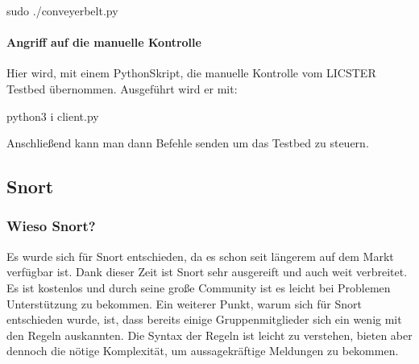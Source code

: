 \documentclass[letterpaper,10pt,ngerman]{sphinxmanual}
\begin{document}
\begin{sphinxVerbatim}[commandchars=\\\{\}]
\PYGZdl{} sudo ./conveyer\PYGZus{}belt.py
\end{sphinxVerbatim}


\paragraph{Angriff auf die manuelle Kontrolle}
\label{\detokenize{ids:angriff-auf-die-manuelle-kontrolle}}
Hier wird, mit einem Python\sphinxhyphen{}Skript, die manuelle Kontrolle vom LICSTER Testbed übernommen.
Ausgeführt wird er mit:

\begin{sphinxVerbatim}[commandchars=\\\{\}]
\PYGZdl{} python3 \PYGZhy{}i client.py
\PYGZgt{}\PYGZgt{}\PYGZgt{}
\end{sphinxVerbatim}

Anschließend kann man dann Befehle senden um das Testbed zu steuern.


\subsection{Snort}
\label{\detokenize{ids:snort}}

\subsubsection{Wieso Snort?}
\label{\detokenize{ids:wieso-snort}}
Es wurde sich für Snort entschieden, da es schon seit längerem auf dem Markt verfügbar ist. Dank dieser Zeit ist Snort sehr ausgereift und auch weit verbreitet. Es ist kostenlos und durch seine große Community ist es leicht bei Problemen Unterstützung zu bekommen. Ein weiterer Punkt, warum sich für Snort entschieden wurde, ist, dass bereits einige Gruppenmitglieder sich ein wenig mit den Regeln auskannten. Die Syntax der Regeln ist leicht zu verstehen, bieten aber dennoch die nötige Komplexität, um aussagekräftige Meldungen zu bekommen.
\end{document}
